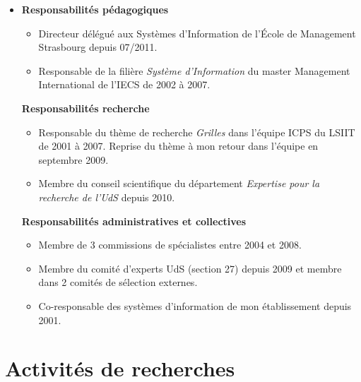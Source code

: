 \documentclass[11pt]{article}
\begin{document}
\begin{itemize}
\item
 	\textbf{Responsabilités pédagogiques}
	\begin{itemize}
		\item Directeur délégué aux Systèmes d'Information de 
		      l'\'Ecole de Management Strasbourg depuis 07/2011.
		\item Responsable de la filière \textit{Système d'Information} 
		      du master Management International de l'IECS de 2002 à 2007.
	\end{itemize}
 	\textbf{Responsabilités recherche}
	\begin{itemize}
		\item Responsable du thème de recherche \textit{Grilles} dans 
		      l'équipe ICPS du LSIIT de 2001 à 2007. 
			Reprise du thème à mon retour dans l'équipe en septembre 2009.
		\item Membre du conseil scientifique du département \emph{Expertise 
		      pour la recherche de l'UdS} depuis 2010.
	\end{itemize}
 	\textbf{Responsabilités administratives et collectives}
	\begin{itemize}
		\item Membre de 3 commissions de spécialistes entre 2004 et 2008.
		\item Membre du comité d'experts UdS (section 27) depuis 2009 et 
		      membre dans 2 comités de sélection externes.
	      \item Co-responsable des systèmes d'information de mon 
		      établissement depuis 2001.
	\end{itemize}
\end{itemize}




\newpage
\section{Activités de recherches}
\end{document}
